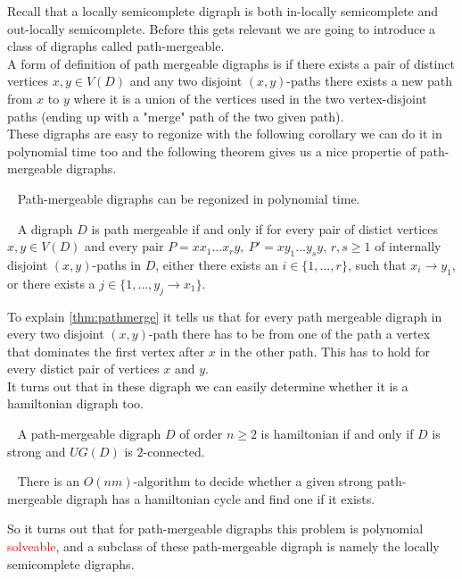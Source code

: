 Recall that a locally semicomplete digraph is both in-locally semicomplete and out-locally semicomplete. 
Before this gets relevant we are going to introduce a class of digraphs called path-mergeable.\\ 
A form of definition of path mergeable digraphs is if there exists a pair of distinct vertices $x,y\in V(D)$ and any two disjoint $(x,y)$-paths there exists a new path from $x$ to $y$ where it is a union of the vertices used in the two vertex-disjoint paths (ending up with a "merge" path of the two given path).\\
These digraphs are easy to regonize with the following corollary we can do it in polynomial time too and the following theorem gives us a nice propertie of path-mergeable digraphs.
\begin{cor}~\cite{banggutin}
    Path-mergeable digraphs can be regonized in polynomial time.
\end{cor}
\begin{thm}~\cite{banggutin}
    A digraph $D$ is path mergeable if and only if for every pair of distict vertices $x,y\in V(D)$ and every pair $P=xx_1\dots x_ry,\ P'=xy_1\dots y_sy$, $r,s\geq 1$ of internally disjoint $(x,y)$-paths in $D$, either there exists an $i\in \lbrace 1,\dots ,r\rbrace$, such that $x_i\rightarrow y_1$, or there exists a $j\in \lbrace 1,\dots, y_j\rightarrow x_1\rbrace$.
    \label{thm:pathmerge}
\end{thm}
To explain \autoref{thm:pathmerge} it tells us that for every path mergeable digraph in every two disjoint $(x,y)$-path there has to be from one of the path a vertex that dominates the first vertex after $x$ in the other path. 
This has to hold for every distict pair of vertices $x$ and $y$. \\
It turns out that in these digraph we can easily determine whether it is a hamiltonian digraph too.
\begin{thm}~\cite{bangJGT20}
    A path-mergeable digraph $D$ of order $n\geq 2$ is hamiltonian if and only if $D$ is strong and $UG(D)$ is $2$-connected.
    \label{thm:pathham}
\end{thm}
\begin{cor}~\cite{bangJGT20}
    There is an $O(nm)$-algorithm to decide whether a given strong path-mergeable digraph has a hamiltonian cycle and find one if it exists.
    \label{cor:polypath}
\end{cor}
So it turns out that for path-mergeable digraphs this problem is polynomial \textcolor{red}{solveable}, and a subclass of these path-mergeable digraph is namely the locally semicomplete digraphs. 
